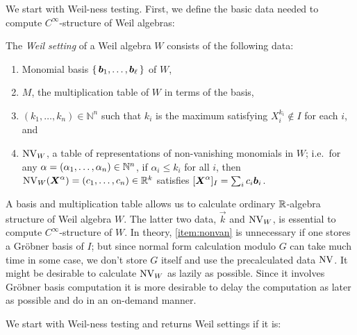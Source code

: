 \documentclass[%
  sigconf,authorversion,screen]{acmart}
\begin{document}
We start with Weil-ness testing.
First, we define the basic data needed to compute $C^\infty$-structure of Weil algebras:

\begin{definition}
  The \emph{Weil setting} of a Weil algebra $W$ consists of the following data:
  \begin{enumerate}[ref=(\arabic*)]
    \item Monomial basis $\set{\boldsymbol{b}_1, \dots, \boldsymbol{b}_\ell}$ of $W$,
    \item $M$, the multiplication table of $W$ in terms of the basis,
    \item $(k_1, \dots, k_n) \in \mathbb{N}^n$ such that $k_i$ is the maximum satisfying $X_i^{k_i} \notin I$ for each $i$, and
    \item $\operatorname{NV}_W$, a table of representations of non-vanishing monomials in $W$;
    i.e.\ for any $\alpha = (\alpha_1, \dots, \alpha_n) \in \mathbb{N}^n$, if $\alpha_i \leq k_i$ for all $i$, then $\operatorname{NV}_W(\boldsymbol{X}^\alpha) = (c_1, \dots, c_n) \in \mathbb{R}^k$ satisfies $[\boldsymbol{X}^\alpha]_I = \sum_i c_i \boldsymbol{b}_i$.\label{item:nonvan}
  \end{enumerate}
\end{definition}

A basis and multiplication table allows us to calculate ordinary $\mathbb{R}$-algebra structure of Weil algebra $W$.
The latter two data, $\vec{k}$ and $\operatorname{NV}_W$, is essential to compute $C^\infty$-structure of $W$.
In theory, \ref{item:nonvan} is unnecessary if one stores a Gr\"{o}bner basis of $I$;
but since normal form calculation modulo $G$ can take much time in some case, we don't store $G$ itself and use the precalculated data $\operatorname{NV}$.
It might be desirable to calculate $\operatorname{NV}_W$ as lazily as possible.
Since it involves Gr\"{o}bner basis computation it is more desirable to delay the computation as later as possible and do in an on-demand manner.

We start with Weil-ness testing and returns Weil settings if it is:
\end{document}
